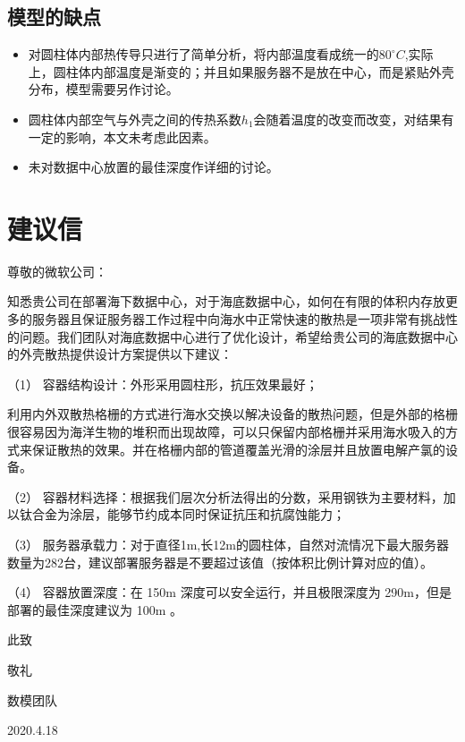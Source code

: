 \documentclass{article}
\begin{document}
 \subsection{模型的缺点}
 	\begin{itemize}
	 	\item 对圆柱体内部热传导只进行了简单分析，将内部温度看成统一的$80^\circ C$,实际上，圆柱体内部温度是渐变的；并且如果服务器不是放在中心，而是紧贴外壳分布，模型需要另作讨论。
	 	\item 圆柱体内部空气与外壳之间的传热系数$h_1$会随着温度的改变而改变，对结果有一定的影响，本文未考虑此因素。
	 	\item 未对数据中心放置的最佳深度作详细的讨论。

   \end{itemize}

 \newpage

 \section{建议信}
    \noindent 尊敬的微软公司：
    
    知悉贵公司在部署海下数据中心，对于海底数据中心，如何在有限的体积内存放更多的服务器且保证服务器工作过程中向海水中正常快速的散热是一项非常有挑战性的问题。我们团队对海底数据中心进行了优化设计，希望给贵公司的海底数据中心的外壳散热提供设计方案提供以下建议：
    
    （1） 容器结构设计：外形采用圆柱形，抗压效果最好；
    
    利用内外双散热格栅的方式进行海水交换以解决设备的散热问题，但是外部的格栅很容易因为海洋生物的堆积而出现故障，可以只保留内部格栅并采用海水吸入的方式来保证散热的效果。并在格栅内部的管道覆盖光滑的涂层并且放置电解产氯的设备。
    
    （2） 容器材料选择：根据我们层次分析法得出的分数，采用钢铁为主要材料，加以钛合金为涂层，能够节约成本同时保证抗压和抗腐蚀能力；
    
    （3） 服务器承载力：对于直径1m,长12m的圆柱体，自然对流情况下最大服务器数量为282台，建议部署服务器是不要超过该值（按体积比例计算对应的值）。
    
    （4） 容器放置深度：在 150m 深度可以安全运行，并且极限深度为 290m，但是部署的最佳深度建议为 100m 。
    
    此致
    
    \noindent 敬礼
    
   \null\hfill 数模团队 
   
   \null\hfill 2020.4.18
    
    \newpage
    
\end{document}
